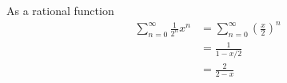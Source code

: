 As a rational function
\begin{align*}
\sum_{n=0}^\infty \frac{1}{2^n} x^n
&= \sum_{n=0}^\infty \left( \frac{x}{2} \right) ^n
\\
&= \frac{1}{1 - x/2}
\\
&= \frac{2}{2 - x}
\end{align*}
